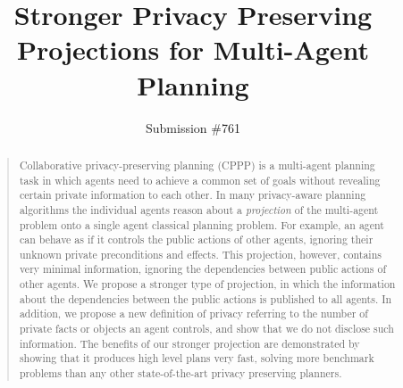 \documentclass[letterpaper]{article}
\theoremstyle{definition}
\begin{document}
%
\title{Stronger Privacy Preserving Projections for Multi-Agent Planning}
\author{Submission \#761}
\maketitle
\begin{abstract}
\begin{quote}
Collaborative privacy-preserving planning (CPPP) is a multi-agent planning task in which agents need to achieve a common set of goals without revealing certain private information to each other. In many privacy-aware planning algorithms the individual agents reason about a {\em projection} of the multi-agent problem onto a single agent classical planning problem. 
For example, an agent can behave as if it controls the public actions of other agents, ignoring their unknown private preconditions and effects. This projection, however, contains very minimal information, ignoring the dependencies between public actions of other agents. We propose a stronger type of projection, in which the information about the dependencies between the public actions is published to all agents. In addition, we propose a new definition of privacy referring to the number of private facts or objects an agent controls, and show that we do not disclose such information.
The benefits of our stronger projection are demonstrated by showing that it produces high level plans very fast, solving more benchmark problems than any other state-of-the-art privacy preserving planners. 
\end{quote}
\end{abstract}
\end{document}
